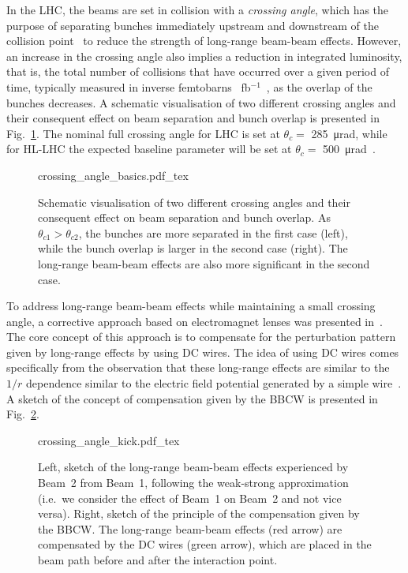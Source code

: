 In the LHC, the beams are set in collision with a \textit{crossing angle}, which has the purpose of separating bunches immediately upstream and downstream of the collision point~\cite{Arduini_2016} to reduce the strength of long-range beam-beam effects. However, an increase in the crossing angle also implies a reduction in integrated luminosity, that is, the total number of collisions that have occurred over a given period of time, typically measured in inverse femtobarns \SI{}{fb}$^{-1}$~\cite{Herr:941318}, as the overlap of the bunches decreases. A schematic visualisation of two different crossing angles and their consequent effect on beam separation and bunch overlap is presented in Fig.~\ref{fig:crossing-angles}. The nominal full crossing angle for LHC is set at $\theta_c =$ \SI{285}{\micro\radian}, while for HL-LHC the expected baseline parameter will be set at $\theta_c =$ \SI{500}{\micro\radian}~\cite{BejarAlonso:2749422}. 

\begin{figure}[hpt]
    \centering
    \def\svgwidth{1.0\textwidth}
    {crossing_angle_basics.pdf_tex}
    \caption{Schematic visualisation of two different crossing angles and their consequent effect on beam separation and bunch overlap. As $\theta_{c1} > \theta_{c2}$, the bunches are more separated in the first case (left), while the bunch overlap is larger in the second case (right). The long-range beam-beam effects are also more significant in the second case.}
    \label{fig:crossing-angles}
\end{figure}

To address long-range beam-beam effects while maintaining a small crossing angle, a corrective approach based on electromagnet lenses was presented in~\cite{Koutchouk:692058}. The core concept of this approach is to compensate for the perturbation pattern given by long-range effects by using DC wires. The idea of using DC wires comes specifically from the observation that these long-range effects are similar to the $1/r$ dependence similar to the electric field potential generated by a simple wire~\cite{PhysRevSTAB.5.074001}. A sketch of the concept of compensation given by the BBCW is presented in Fig.~\ref{fig:wire-baseline}.

\begin{figure}[hpt]
    \centering
    \def\svgwidth{1.0\textwidth}
    {crossing_angle_kick.pdf_tex}
    \caption{Left, sketch of the long-range beam-beam effects experienced by Beam~2 from Beam~1, following the weak-strong approximation (i.e.\ we consider the effect of Beam~1 on Beam~2 and not vice versa). Right, sketch of the principle of the compensation given by the BBCW. The long-range beam-beam effects (red arrow) are compensated by the DC wires (green arrow), which are placed in the beam path before and after the interaction point.}
    \label{fig:wire-baseline}
\end{figure}

